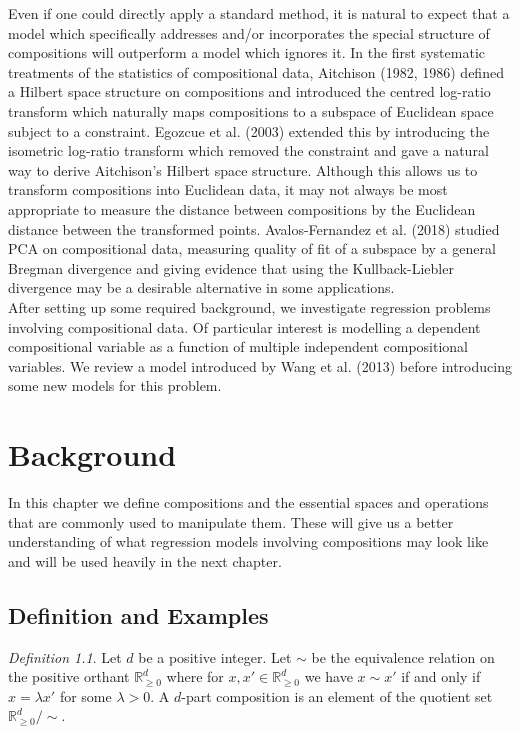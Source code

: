 \documentclass[BSc]{usydthesis}
\numberwithin{equation}{chapter}
\theoremstyle{remark}
\newtheorem{Definition}[equation]{Definition}
\begin{document}
Even if one could directly apply a standard method, it is natural to expect that a model which specifically addresses and/or incorporates the special structure of compositions will outperform a model which ignores it. In the first systematic treatments of the statistics of compositional data, Aitchison (1982, 1986) defined a Hilbert space structure on compositions and introduced the centred log-ratio transform which naturally maps compositions to a subspace of Euclidean space subject to a constraint. Egozcue et al. (2003) extended this by introducing the isometric log-ratio transform which removed the constraint and gave a natural way to derive Aitchison's Hilbert space structure. Although this allows us to transform compositions into Euclidean data, it may not always be most appropriate to measure the distance between compositions by the Euclidean distance between the transformed points. Avalos-Fernandez et al. (2018) studied PCA on compositional data, measuring quality of fit of a subspace by a general Bregman divergence and giving evidence that using the Kullback-Liebler divergence may be a desirable alternative in some applications.\\

After setting up some required background, we investigate regression problems involving compositional data. Of particular interest is modelling a dependent compositional variable as a function of multiple independent compositional variables. We review a model introduced by Wang et al. (2013) before introducing some new models for this problem. 
 
 
 
\chapter{Background}

In this chapter we define compositions and the essential spaces and operations that are commonly used to manipulate them. These will give us a better understanding of what regression models involving compositions may look like and will be used heavily in the next chapter.

\section{Definition and Examples}
\begin{Definition}
Let $d$ be a positive integer. Let $\sim$ be the equivalence relation on the positive orthant $\mathbb{R}^d_{\geq 0}$ where for $x, x' \in \mathbb{R}^d_{\geq 0}$ we have $x \sim x'$ if and only if $x = \lambda x'$ for some $\lambda > 0.$ A $d$-part composition is an element of the quotient set $\mathbb{R}^d_{\geq 0}/\sim.$ 
\end{Definition}
\end{document}
